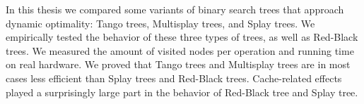 \documentclass[12pt]{report}
\begin{document}
In this thesis we compared some variants of binary search trees that approach dynamic optimality: Tango trees, Multisplay trees, and Splay trees. We empirically tested the behavior of these three types of trees, as well as Red-Black trees. We measured the amount of visited nodes per operation and running time on real hardware. 
We proved that Tango trees and Multisplay trees are in most cases less efficient than Splay trees and Red-Black trees. Cache-related effects played a surprisingly large part in the behavior of Red-Black tree and Splay tree.
\end{document}
